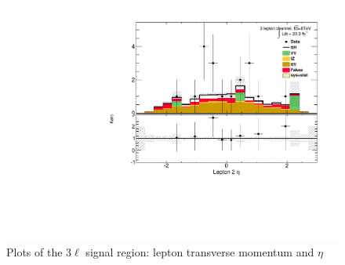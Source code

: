 \begin{figure}[!htbp]
\begin{minipage}[h]{0.5\textwidth}
    \centering \includegraphics[width=\textwidth]{figs/results/plotCand_3lep_Lep2MLEta}
  \end{minipage}\hfill
\caption{Plots of the 3$\ell$ signal region: lepton transverse momentum and $\eta$} 
\label{figure:results_3l_lep}
\end{figure} 


